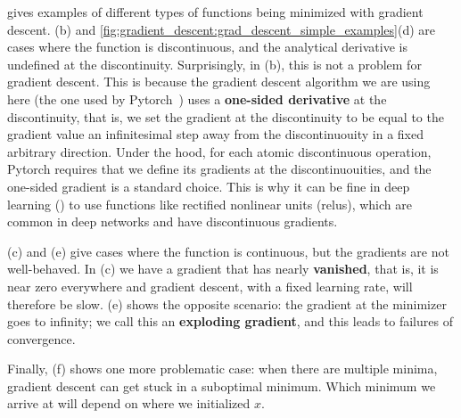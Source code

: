 \Fig{\ref{fig:gradient_descent:grad_descent_simple_examples}} gives examples of different types of functions being minimized with gradient descent. \Figs{\ref{fig:gradient_descent:grad_descent_simple_examples}}(b) and \ref{fig:gradient_descent:grad_descent_simple_examples}(d) are cases where the function is discontinuous, and the analytical derivative is undefined at the discontinuity. Surprisingly, in \fig{\ref{fig:gradient_descent:grad_descent_simple_examples}}(b), this is not a problem for gradient descent. This is because the gradient descent algorithm we are using here (the one used by Pytorch~\cite{paszke2019pytorch}) uses a \textbf{one-sided derivative} at the discontinuity, that is, we set the gradient at the discontinuity to be equal to the gradient value an infinitesimal step away from the discontinuouity in a fixed arbitrary direction. Under the hood, for each atomic discontinuous operation, Pytorch requires that we define its gradients at the discontinuouities, and the one-sided gradient is a standard choice. This is why it can be fine in deep learning (\chap{\ref{chapter:neural_nets}}) to use functions like rectified nonlinear units (relus), which are common in deep networks and have discontinuous gradients.

\Figs{\ref{fig:gradient_descent:grad_descent_simple_examples}}(c) and (e) give cases where the function is continuous, but the gradients are not well-behaved. In \fig{\ref{fig:gradient_descent:grad_descent_simple_examples}}(c) we have a gradient that has nearly \textbf{vanished}, that is, it is near zero everywhere and gradient descent, with a fixed learning rate, will therefore be slow. \Fig{\ref{fig:gradient_descent:grad_descent_simple_examples}}(e) shows the opposite scenario: the gradient at the minimizer goes to infinity; we call this an \textbf{exploding gradient}, and this leads to failures of convergence. 

Finally, \fig{\ref{fig:gradient_descent:grad_descent_simple_examples}}(f) shows one more problematic case: when there are multiple minima, gradient descent can get stuck in a suboptimal minimum. Which minimum we arrive at will depend on where we initialized $x$.  

